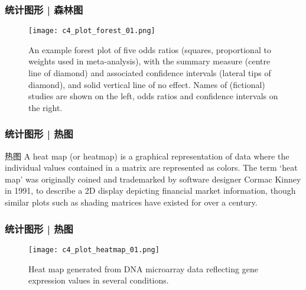 \begin{frame}
  \frametitle{统计图形 | 森林图}
  \begin{figure}
    \centering
    \texttt{[image: c4\_plot\_forest\_01.png]}
    \caption{An example forest plot of five odds ratios (squares, proportional to weights used in meta-analysis), with the summary measure (centre line of diamond) and associated confidence intervals (lateral tips of diamond), and solid vertical line of no effect. Names of (fictional) studies are shown on the left, odds ratios and confidence intervals on the right.}
  \end{figure}
\end{frame}

\begin{frame}
  \frametitle{统计图形 | 热图}
  \begin{block}{热图}
    A heat map (or heatmap) is a graphical representation of data where the individual values contained in a matrix are represented as colors. The term `heat map' was originally coined and trademarked by software designer Cormac Kinney in 1991, to describe a 2D display depicting financial market information, though similar plots such as shading matrices have existed for over a century.
  \end{block}
\end{frame}

\begin{frame}
  \frametitle{统计图形 | 热图}
  \begin{figure}
    \centering
    \texttt{[image: c4\_plot\_heatmap\_01.png]}
    \caption{Heat map generated from DNA microarray data reflecting gene expression values in several conditions.}
  \end{figure}
\end{frame}

